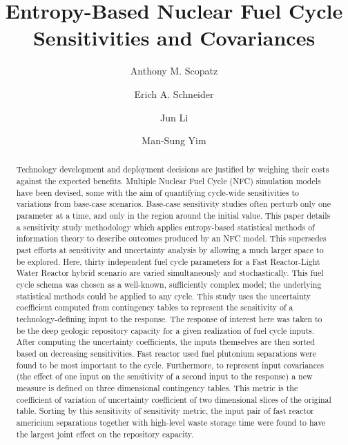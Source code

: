 \documentclass[preprint,12pt]{elsarticle}
\begin{document}
\begin{frontmatter}
\title{Entropy-Based Nuclear Fuel Cycle Sensitivities and Covariances}%

\author[ut]{Anthony M. Scopatz}

\author[ut]{Erich A. Schneider}

\author[unc]{Jun Li}

\author[kaist]{Man-Sung Yim}

\address[ut]{The University of Texas at Austin, Mechanical Engineering, 1 University Station C2200, Austin, Texas, USA, 78712}

\address[unc]{University of North Carolina at Chapel Hill, Environmental Sciences and Engineering, Chapel Hill, NC}

\address[kaist]{KAIST Department of Nuclear \& Quantum Engineering, 291 Daehak-roq, Yuseong-gu, Daejeon 305-701, Republic of Korea}


\begin{abstract}
Technology development and deployment decisions are justified by weighing their costs
against the expected benefits.  Multiple Nuclear Fuel Cycle (NFC) simulation models
have been devised, some with the aim of quantifying cycle-wide sensitivities to variations from
base-case scenarios.  Base-case sensitivity studies often perturb only one parameter at a time,
and only in the region around the initial value.  This paper details a sensitivity study methodology
which applies entropy-based statistical methods of information theory to describe outcomes produced by
an NFC model.  This supersedes past efforts at sensitivity and uncertainty analysis by allowing
a much larger space to be explored.  Here, thirty independent fuel cycle parameters for a Fast Reactor-Light
Water Reactor hybrid scenario are varied simultaneously and stochastically.  This fuel cycle schema was chosen
as a well-known, sufficiently complex model; the underlying statistical methods could be applied to any cycle.
This study uses the uncertainty coefficient computed from contingency tables to represent the
sensitivity of a technology-defining input to the response.  The response of interest here was
taken to be the deep geologic repository capacity for a given realization of fuel cycle inputs.
After computing the uncertainty coefficients, the inputs themselves are then sorted based on
decreasing sensitivities.  Fast reactor used fuel plutonium separations were
found to be most important to the cycle.  Furthermore, to represent input covariances (the effect of one
input on the sensitivity of a second input to the response) a new measure is defined on three dimensional
contingency tables.  This metric is the coefficient of variation of uncertainty coefficient of two
dimensional slices of the original table.  Sorting by this sensitivity of sensitivity metric,
the input pair of fast reactor americium separations together with high-level waste storage time
were found to have the largest joint effect on the repository capacity.
\end{abstract}


\end{frontmatter}
\end{document}
